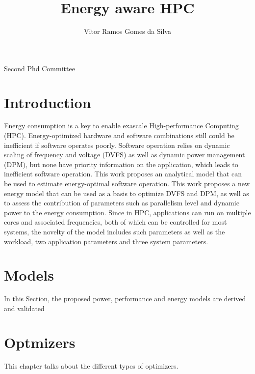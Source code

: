 \documentclass{report}
\begin{document}
\title{Energy aware HPC}
\author{Vitor Ramos Gomes da Silva}
 
\beforepreface
{}
Second Phd Committee
\afterpreface

\chapter{Introduction}
Energy consumption is a key to enable exascale High-performance Computing (HPC). Energy-optimized hardware and software combinations still could be inefficient if software operates poorly. 
Software operation relies on dynamic scaling of frequency and voltage (DVFS) as well as dynamic power management (DPM), but none have priority information on the application, which leads to inefficient software operation. This work proposes an analytical model that can be used to estimate energy-optimal software operation. 
This work proposes a new energy model that can be used as a basis to optimize DVFS and DPM, as well as to assess the contribution of parameters such as parallelism level and dynamic power to the energy consumption.
Since in HPC, applications can run on multiple cores and associated frequencies, both of which can be controlled for most systems, the novelty of the model includes such parameters as well as the workload, two application parameters and three system parameters.


%


\chapter{Models}
In this Section, the proposed power, performance and energy models are derived and validated



\chapter{Optmizers}
This chapter talks about the different types of optimizers.


\end{document}
